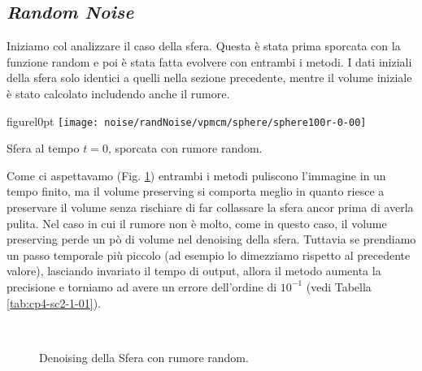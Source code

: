 %
\subsection{\emph{Random Noise}}
Iniziamo col analizzare il caso della sfera. Questa è stata prima
sporcata con la funzione random e poi è stata fatta evolvere con
entrambi i metodi.
I dati iniziali della sfera solo identici a quelli nella sezione
precedente, mentre il volume iniziale è stato calcolato includendo
anche il rumore.

\begin{wrapfloat}{figure}{l}{0pt}
\texttt{[image: noise/randNoise/vpmcm/sphere/sphere100r-0-00]}
\caption{Sfera al tempo $t=0$, sporcata con rumore random.}
\end{wrapfloat}

Come ci aspettavamo (Fig. \ref{fig:cp4-sc2-1-01}) entrambi i
metodi puliscono l'immagine in un tempo finito, ma il volume
preserving si comporta meglio in quanto riesce a preservare il volume
senza rischiare di far collassare la sfera ancor prima di averla
pulita. Nel caso in cui il rumore non è molto, come in questo caso, il
volume preserving perde un pò di volume nel denoising della sfera. 
Tuttavia se prendiamo un passo temporale più piccolo (ad esempio lo
dimezziamo rispetto al precedente valore), lasciando invariato il
tempo di output, allora il metodo aumenta la precisione e torniamo ad
avere un errore dell'ordine di $10^{-1}$ (vedi Tabella \ref{tab:cp4-sc2-1-01}).

\begin{figure}[htb!]
  \centering
  \quad
  \\
  \quad
  \quad
  \caption{Denoising della Sfera con rumore random.}
  \label{fig:cp4-sc2-1-01}
\end{figure}

